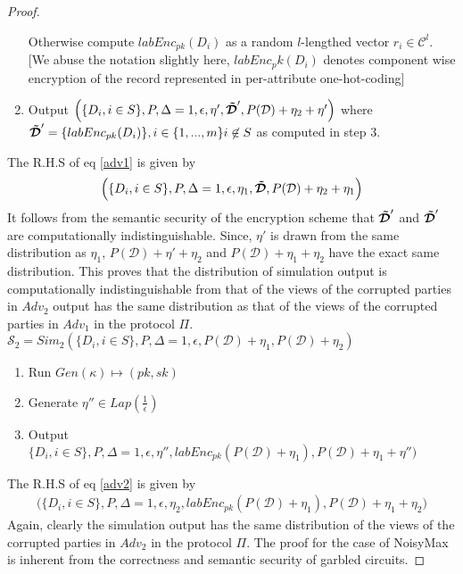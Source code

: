 \begin{proof}
\begin{enumerate}
Otherwise compute $labEnc_{pk}(D_i)$ as a random $l$-lengthed vector $r_i \in \mathcal{C}^l$. [We abuse the notation slightly here, $labEnc_pk(D_i)$ denotes component wise encryption of the record represented in per-attribute one-hot-coding]
\item Output $\Big(\{D_i, i \in S\},P,\Delta=1,\epsilon,\eta',\boldsymbol{\tilde{\mathcal{D}}}',P(\mathcal{D})+\eta_2+\eta'\Big)$ where $\boldsymbol{\tilde{\mathcal{D}}}'=\{labEnc_{pk}(D_i)\},i \in \{1,...,m\} i \not \in S$ as computed in step 3.
\end{enumerate}
The R.H.S of eq \ref{adv1}  is given by 
\begin{gather}\Big(\{D_i, i \in S\},P,\Delta=1,\epsilon, \eta_1,\boldsymbol{\tilde{\mathcal{D}}},P(\mathcal{D})+\eta_2+\eta_1\Big)\end{gather}
It follows from the semantic security of the encryption scheme that $\boldsymbol{\tilde{\mathcal{D}}}'$ and $\boldsymbol{\tilde{\mathcal{D}}}'$ are computationally indistinguishable.
Since, $\eta'$ is drawn from the same distribution as $\eta_1$, $P(\mathcal{D})+\eta'+\eta_2$ and $P(\mathcal{D})+\eta_1+\eta_2$ have the exact same distribution. This proves that the distribution of simulation output is computationally indistinguishable from that of the views of the corrupted parties in $Adv_2$
output has the same distribution as that of the views of the corrupted parties in $Adv_1$ in the
protocol $\Pi$.\\
$\mathcal{S}_2=Sim_2(\{D_i, i \in S\},P,\Delta=1,\epsilon,P(\mathcal{D})+\eta_1,P(\mathcal{D})+\eta_2)$
\begin{enumerate}\item Run $Gen(\kappa)\mapsto (pk,sk)$ \item Generate $\eta'' \in Lap(\frac{1}{\epsilon})$ \item Output $\Big\{D_i, i \in S\},P,\Delta=1,\epsilon, \eta'', labEnc_{pk}(P(\mathcal{D})+\eta_1), P(\mathcal{D})+\eta_1+\eta''\Big)$
\end{enumerate}
The R.H.S of eq \ref{adv2} is given by \begin{gather}\Big(\{D_i, i \in S\},P,\Delta=1,\epsilon,\eta_2,labEnc_{pk}(P(\mathcal{D})+\eta_1),P(\mathcal{D})+\eta_1+\eta_2\Big)\end{gather}
Again, clearly the simulation output has the same distribution of the
views of the corrupted parties in $Adv_2$ in the protocol $\Pi$. 
The proof for the case of NoisyMax is inherent from the correctness and semantic security of garbled circuits.
\end{proof}